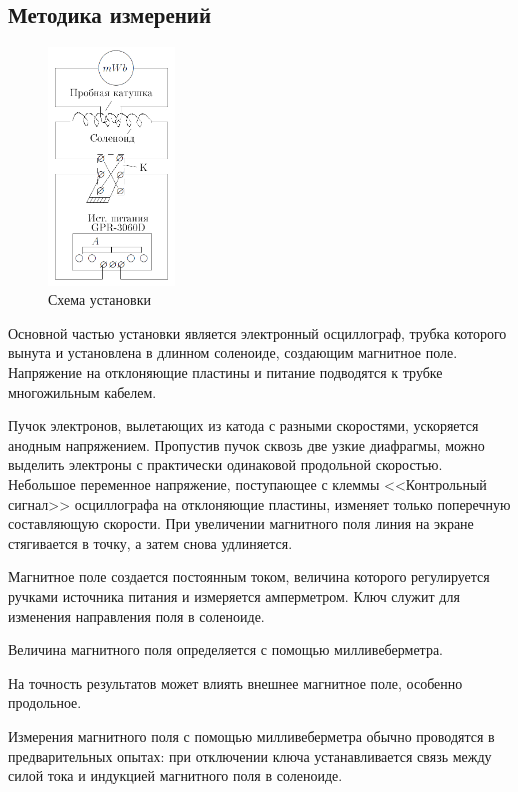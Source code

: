 \documentclass[a4paper, 12pt]{article}
\begin{document}
\subsection{Методика измерений}

\begin{figure}
  \begin{center}
    \includegraphics[width = 0.3\textwidth]{1.png}
  \end{center}
  \caption{Схема установки}
  \label{ris1}
\end{figure}
Основной частью установки является электронный осциллограф, трубка которого вынута и установлена в длинном соленоиде, создающим магнитное поле. Напряжение на отклоняющие пластины и питание подводятся к трубке многожильным кабелем.

Пучок электронов, вылетающих из катода с разными скоростями, ускоряется анодным напряжением. Пропустив пучок сквозь две узкие диафрагмы, можно выделить электроны с практически одинаковой продольной скоростью. Небольшое переменное напряжение, поступающее с клеммы <<Контрольный сигнал>> осциллографа на отклоняющие пластины, изменяет только поперечную составляющую скорости. При увеличении магнитного поля линия на экране стягивается в точку, а затем снова удлиняется. 

Магнитное поле создается постоянным током, величина которого регулируется ручками источника питания и измеряется амперметром. Ключ служит для изменения направления поля в соленоиде.

Величина магнитного поля определяется с помощью милливеберметра.

На точность результатов может влиять внешнее магнитное поле, особенно продольное. 

Измерения магнитного поля с помощью милливеберметра обычно проводятся в предварительных опытах: при отключении ключа устанавливается связь между силой тока и индукцией магнитного поля в соленоиде. 
\end{document}

